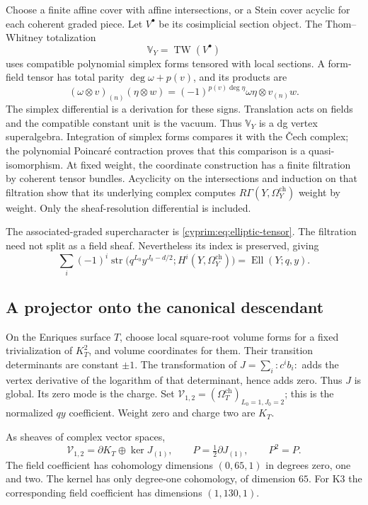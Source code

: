 Choose a finite affine cover with affine intersections,
or a Stein cover acyclic for each coherent graded
piece. Let $V^\bullet$ be its cosimplicial section
object. The Thom--Whitney totalization
\[
 \mathbb V_Y=\operatorname{TW}(V^\bullet)
\]
uses compatible polynomial simplex forms tensored
with local sections. A form-field tensor has total
parity $\deg\omega+p(v)$, and its products are
\begin{equation}\label{cyprim:eq:TW-products}
 (\omega\otimes v)_{(n)}(\eta\otimes w)
 =(-1)^{p(v)\deg\eta}\omega\eta\otimes v_{(n)}w.
\end{equation}
The simplex differential is a derivation for these
signs. Translation acts on fields and the compatible
constant unit is the vacuum. Thus $\mathbb V_Y$
is a dg vertex superalgebra. Integration of simplex
forms compares it with the \v Cech complex; the
polynomial Poincar\'e contraction proves that this
comparison is a quasi-isomorphism. At fixed weight,
the coordinate construction has a finite filtration
by coherent tensor bundles. Acyclicity on the
intersections and induction on that filtration show
that its underlying complex computes
$R\Gamma(Y,\Omega_Y^{\mathrm{ch}})$ weight by weight.
Only the sheaf-resolution differential is included.

The associated-graded supercharacter is
\eqref{cyprim:eq:elliptic-tensor}. The filtration
need not split as a field sheaf. Nevertheless its
index is preserved, giving
\[
 \sum_i(-1)^i\operatorname{str}
 \bigl(q^{L_0}y^{J_0-d/2};H^i(Y,\Omega_Y^{\mathrm{ch}})\bigr)
 =\operatorname{Ell}(Y;q,y).
\]

\subsection{A projector onto the canonical descendant}

On the Enriques surface $T$, choose local square-root
volume forms for a fixed trivialization of $K_T^2$,
and volume coordinates for them. Their transition
determinants are constant $\pm1$. The transformation
of $J=\sum_i:c^ib_i:$ adds the vertex derivative of
the logarithm of that determinant, hence adds zero.
Thus $J$ is global. Its zero mode is the charge.
Set
$\mathscr V_{1,2}=(\Omega_T^{\mathrm{ch}})_{L_0=1,J_0=2}$;
this is the normalized $qy$ coefficient.
Weight zero and charge two are $K_T$.

\begin{proposition}\label{cyprim:prop:charge-projector}
As sheaves of complex vector spaces,
\[
 \mathscr V_{1,2}=\partial K_T\oplus\ker J_{(1)},
 \qquad P=\tfrac12\partial J_{(1)},\qquad P^2=P.
\]
The field coefficient has cohomology dimensions
$(0,65,1)$ in degrees zero, one and two.
The kernel has only degree-one cohomology, of
dimension $65$. For K3 the corresponding field
coefficient has dimensions $(1,130,1)$.
\end{proposition}

